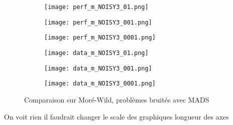 \documentclass[letterpaper]{scrartcl}
\begin{document}
\begin{figure}[!htb] %
	\begin{subfigure}{0.48\textwidth}
		\texttt{[image: perf\_m\_NOISY3\_01.png]}
	\end{subfigure}\hspace*{\fill}
	\begin{subfigure}{0.48\textwidth}
		\texttt{[image: perf\_m\_NOISY3\_001.png]}
	\end{subfigure}
	\medskip
	\begin{subfigure}{0.48\textwidth}
		\texttt{[image: perf\_m\_NOISY3\_0001.png]}
	\end{subfigure}\hspace*{\fill}
	\begin{subfigure}{0.48\textwidth}
		\texttt{[image: data\_m\_NOISY3\_01.png]}
	\end{subfigure}
	\medskip
	\begin{subfigure}{0.48\textwidth}
		\texttt{[image: data\_m\_NOISY3\_001.png]}
	\end{subfigure}\hspace*{\fill}
	\begin{subfigure}{0.48\textwidth}
		\texttt{[image: data\_m\_NOISY3\_0001.png]}
	\end{subfigure}
	\caption{Comparaison sur Moré-Wild, problèmes bruités avec MADS} \label{fig:11}
\end{figure}
\clearpage
On voit rien il faudrait changer le scale des graphiques longueur des axes
\clearpage
\end{document}
